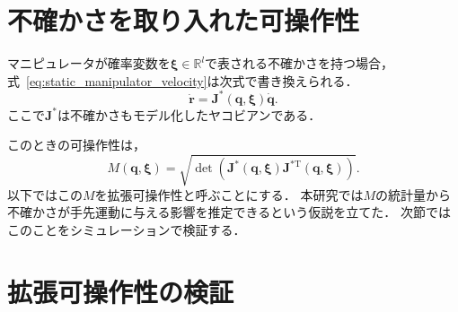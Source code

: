 \documentclass[10pt,a4j,twocolumn]{ltjsarticle}
\begin{document}
\section{不確かさを取り入れた可操作性}

マニピュレータが確率変数を$\bm{\xi} \in \mathbb{R}^{l}$で表される不確かさを持つ場合，式~\eqref{eq:static_manipulator_velocity}は次式で書き換えられる．
\begin{equation}
  \dot{\bm{r}} = \bm{J}^{*}(\bm{q}, \bm{\xi}) \dot{\bm{q}}. \label{eq:static_manipulator_velocity_with_uncertainty}
\end{equation}
ここで$\bm{J}^{*}$は不確かさもモデル化したヤコビアンである．

このときの可操作性は，
\begin{equation}
  M(\bm{q}, \bm{\xi}) = \sqrt{\det \left( \bm{J}^{*}(\bm{q}, \bm{\xi}) \bm{J}^{*\mathrm{T}}(\bm{q}, \bm{\xi}) \right)}.
\end{equation}
以下ではこの$M$を拡張可操作性と呼ぶことにする．
本研究では$M$の統計量から不確かさが手先運動に与える影響を推定できるという仮説を立てた．
次節ではこのことをシミュレーションで検証する．

\section{拡張可操作性の検証}
\end{document}
